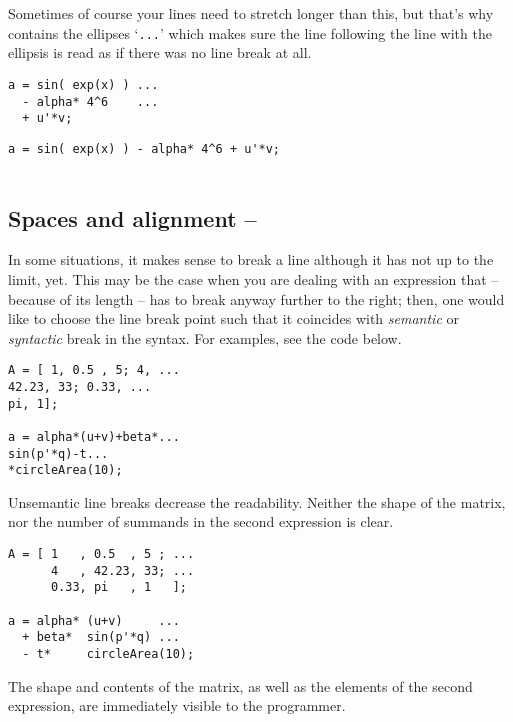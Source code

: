 Sometimes of course your lines need to stretch longer than this, but that's
why \matlab{} contains the ellipses `\lstinline!...!' which makes sure the
line following the line with the ellipsis is read as if there was no line
break at all.

\hfill
\begin{minipage}[t]{.45\textwidth}
\begin{lstlisting}[framerule=2pt,rulecolor=\color{goodgreen}]
a = sin( exp(x) ) ...
  - alpha* 4^6    ...
  + u'*v;
\end{lstlisting}
\end{minipage}
\hfill
\begin{minipage}[t]{.45\textwidth}
\begin{lstlisting}[framerule=2pt,rulecolor=\color{badred}]
a = sin( exp(x) ) - alpha* 4^6 + u'*v;


\end{lstlisting}
\end{minipage}
\hfill


\subsection{Spaces and alignment -- \cleansymbol\cleansymbol\cleansymbol}\label{paragraph:alignment}
In some situations, it makes sense to break a line although it has not up to the limit, yet. This may be the case when you are dealing with an expression that -- because of its length -- has to break anyway further to the right; then, one would like to choose the line break point such that it coincides with \emph{semantic} or \emph{syntactic} break in the syntax. For examples, see the code below.

\hfill
\begin{minipage}[t]{.45\textwidth}
\begin{lstlisting}[framerule=2pt,rulecolor=\color{badred}]
A = [ 1, 0.5 , 5; 4, ...
42.23, 33; 0.33, ...
pi, 1];

a = alpha*(u+v)+beta*...
sin(p'*q)-t...
*circleArea(10);
\end{lstlisting}
Unsemantic line breaks decrease the readability. Neither the shape of the
matrix, nor the number of summands in the second expression is clear.
\end{minipage}
\hfill
\begin{minipage}[t]{.45\textwidth}
\begin{lstlisting}[framerule=2pt,rulecolor=\color{goodgreen}]
A = [ 1   , 0.5  , 5 ; ...
      4   , 42.23, 33; ...
      0.33, pi   , 1   ];

a = alpha* (u+v)     ...
  + beta*  sin(p'*q) ...
  - t*     circleArea(10);
\end{lstlisting}
The shape and contents of the matrix, as well as the elements of the second expression, are immediately visible to the programmer.
\end{minipage}
\hfill

